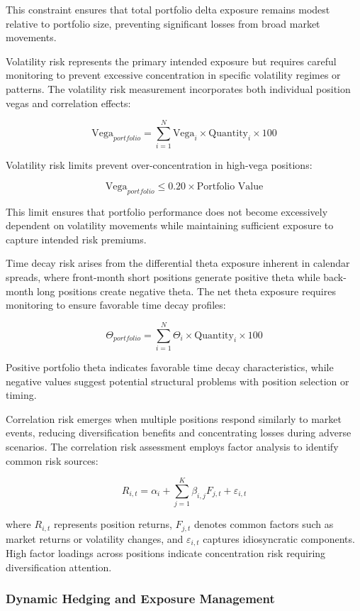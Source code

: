 \documentclass[
  american,
  11pt,
  11pt,
  letterpaper,
  onecolumn]{article}
\begin{document}
This constraint ensures that total portfolio delta exposure remains
modest relative to portfolio size, preventing significant losses from
broad market movements.

Volatility risk represents the primary intended exposure but requires
careful monitoring to prevent excessive concentration in specific
volatility regimes or patterns. The volatility risk measurement
incorporates both individual position vegas and correlation effects:

\[\text{Vega}_{portfolio} = \sum_{i=1}^{N} \text{Vega}_i \times \text{Quantity}_i \times 100\]

Volatility risk limits prevent over-concentration in high-vega
positions:

\[\text{Vega}_{portfolio} \leq 0.20 \times \text{Portfolio Value}\]

This limit ensures that portfolio performance does not become
excessively dependent on volatility movements while maintaining
sufficient exposure to capture intended risk premiums.

Time decay risk arises from the differential theta exposure inherent in
calendar spreads, where front-month short positions generate positive
theta while back-month long positions create negative theta. The net
theta exposure requires monitoring to ensure favorable time decay
profiles:

\[\Theta_{portfolio} = \sum_{i=1}^{N} \Theta_i \times \text{Quantity}_i \times 100\]

Positive portfolio theta indicates favorable time decay characteristics,
while negative values suggest potential structural problems with
position selection or timing.

Correlation risk emerges when multiple positions respond similarly to
market events, reducing diversification benefits and concentrating
losses during adverse scenarios. The correlation risk assessment employs
factor analysis to identify common risk sources:

\[R_{i,t} = \alpha_i + \sum_{j=1}^{K} \beta_{i,j} F_{j,t} + \varepsilon_{i,t}\]

where \(R_{i,t}\) represents position returns, \(F_{j,t}\) denotes
common factors such as market returns or volatility changes, and
\(\varepsilon_{i,t}\) captures idiosyncratic components. High factor
loadings across positions indicate concentration risk requiring
diversification attention.

\subsubsection{Dynamic Hedging and Exposure
Management}\label{dynamic-hedging-and-exposure-management}
\end{document}
